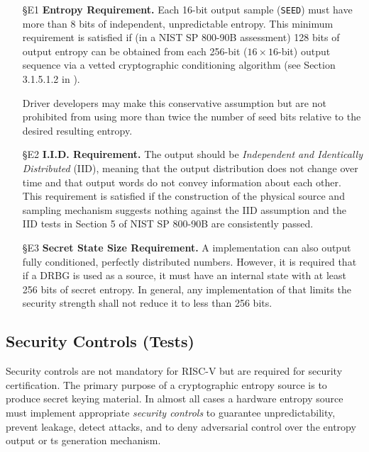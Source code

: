 {    \begin{itemize}

    \item[\S E1]    {\bf Entropy Requirement.}
    Each 16-bit output sample (\verb|SEED|) must have more than 8 bits of
    independent, unpredictable entropy. This minimum requirement is
    satisfied if (in a NIST SP 800-90B \cite{TuBaKe+18} assessment) 128
    bits of output entropy can be obtained from each 256-bit
    ($16 \times 16$-bit)  output sequence via a vetted
    cryptographic conditioning algorithm (see Section 3.1.5.1.2 in
    \cite{TuBaKe+18}).

    Driver developers may make this conservative assumption but are not
    prohibited from using more than twice the number of seed bits relative
    to the desired resulting entropy.

    \item[\S E2]    {\bf I.I.D. Requirement.}
    The output should be \emph{Independent and Identically Distributed}
    (IID), meaning that the output distribution does not change over time
    and that output words do not convey information about each other.
    This requirement is satisfied if the construction of the physical source
    and sampling mechanism suggests nothing against the IID assumption
    and the IID tests in Section 5 of NIST SP 800-90B \cite{TuBaKe+18} are
    consistently passed.

    \item[\S E3]    {\bf Secret State Size Requirement.}
    A  implementation can also output fully conditioned,
    perfectly distributed numbers. However, it is required that if a DRBG is
    used as a source, it must have an internal state with at least 256 bits
    of secret entropy. In general, any implementation of 
    that limits the security strength shall not reduce it to less than
    256 bits.

    \end{itemize}



\subsection{Security Controls (Tests)}
\label{sec:security-controls}

    Security controls are not mandatory for RISC-V but are required for
    security certification.
    The primary purpose of a cryptographic entropy source is to produce
    secret keying material. In almost all cases a hardware entropy source
    must implement appropriate \emph{security controls} to guarantee
    unpredictability, prevent leakage, detect attacks, and to deny
    adversarial control over the entropy output or ts generation mechanism.

}
